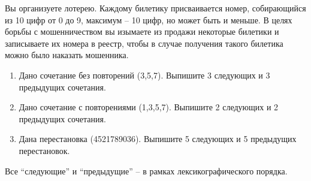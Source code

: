 \question
Вы организуете лотерею. Каждому билетику присваивается номер, собирающийся из 10 цифр от 0 до 9, максимум – 10 цифр, но может быть и меньше. В целях борьбы с мошенничеством вы изымаете из продажи некоторые билетики и записываете их номера в реестр, чтобы в случае получения такого билетика можно было наказать мошенника.

\begin{enumerate}
\item Дано сочетание без повторений (3,5,7). Выпишите 3 следующих и 3 предыдущих сочетания.
	\item Дано сочетание с повторениями (1,3,5,7). Выпишите 2 следующих и 2 предыдущих сочетания.
	\item Дана перестановка (4521789036). Выпишите 5 следующих и 5 предыдущих перестановок.
\end{enumerate}

Все “следующие” и “предыдущие” – в рамках лексикографического порядка.
